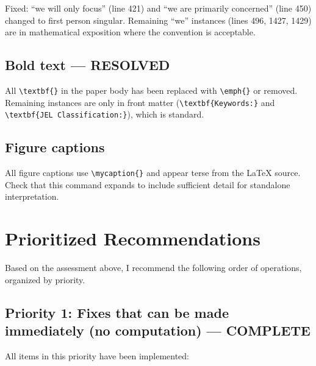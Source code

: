 \documentclass[12pt,a4paper]{article}
\begin{document}
Fixed: ``we will only focus'' (line 421) and ``we are primarily concerned''
(line 450) changed to first person singular. Remaining ``we'' instances
(lines 496, 1427, 1429) are in mathematical exposition where the convention
is acceptable.

\subsection{Bold text --- RESOLVED}

All \verb|\textbf{}| in the paper body has been replaced with \verb|\emph{}|
or removed. Remaining instances are only in front matter
(\verb|\textbf{Keywords:}| and \verb|\textbf{JEL Classification:}|), which is
standard.

\subsection{Figure captions}

All figure captions use \verb|\mycaption{}| and appear terse from the LaTeX
source. Check that this command expands to include sufficient detail for
standalone interpretation.


\section{Prioritized Recommendations}

Based on the assessment above, I recommend the following order of operations,
organized by priority.

\subsection{Priority 1: Fixes that can be made immediately (no computation)
--- COMPLETE}

All items in this priority have been implemented:
\end{document}
